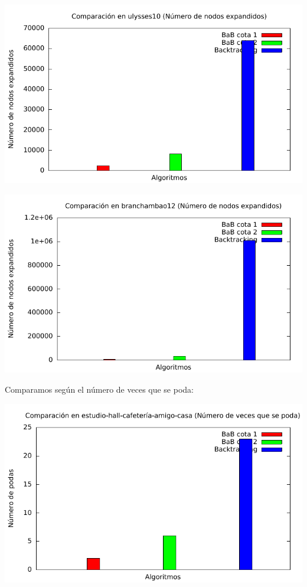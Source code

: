 \includegraphics[width=15cm]{img/barras_ulysses10_nodos}

\includegraphics[width=15cm]{img/barras_branchambao12_nodos}

Comparamos según el número de veces que se poda:

\includegraphics[width=15cm]{img/barras_e-h-c-a-c5_poda}

